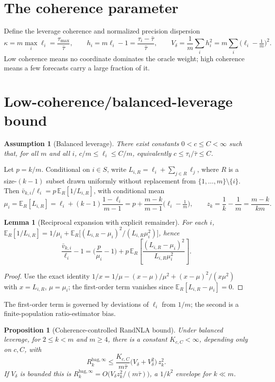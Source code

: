 \documentclass[11pt]{article}
\newcommand{\E}{\mathbb{E}}
\newcommand{\Rk}{R_k^{\mathrm{bag},\infty}}
\newtheorem{assumption}{Assumption}
\newtheorem{lemma}{Lemma}
\newtheorem{proposition}{Proposition}
\begin{document}
\section{The coherence parameter}
Define the leverage coherence and normalized precision dispersion
\[
  \kappa=m\max_i\ell_i=\frac{\tau_{\max}}{\bar\tau},\qquad
  h_i=m\ell_i-1=\frac{\tau_i-\bar\tau}{\bar\tau},\qquad
  V_\delta=\frac1m\sum_i h_i^2=m\sum_i\Big(\ell_i-\tfrac1m\Big)^2.
\]
Low coherence means no coordinate dominates the oracle weight; high coherence means a few
forecasts carry a large fraction of it.

\section{Low-coherence/balanced-leverage bound}
\begin{assumption}[Balanced leverage]\label{ass:bl}
There exist constants $0<c\le C<\infty$ such that, for all $m$ and all $i$,
$c/m\le\ell_i\le C/m$, equivalently $c\le\tau_i/\bar\tau\le C$.
\end{assumption}
Let $p=k/m$. Conditional on $i\in S$, write $L_{i,R}=\ell_i+\sum_{j\in R}\ell_j$, where $R$
is a size-$(k-1)$ subset drawn uniformly without replacement from $\{1,\dots,m\}\setminus\{i\}$.
Then $\bar v_{k,i}/\ell_i=p\,\E_R[1/L_{i,R}]$, with conditional mean
\[
  \mu_i=\E_R[L_{i,R}]=\ell_i+(k-1)\frac{1-\ell_i}{m-1}
  =p+\frac{m-k}{m-1}\Big(\ell_i-\tfrac1m\Big),\qquad
  z_k=\frac1k-\frac1m=\frac{m-k}{km}.
\]
\begin{lemma}[Reciprocal expansion with explicit remainder]\label{lem:recip}
For each $i$,
$\E_R[1/L_{i,R}]=1/\mu_i+\E_R\!\big[(L_{i,R}-\mu_i)^2/(L_{i,R}\mu_i^2)\big]$, hence
\[
  \frac{\bar v_{k,i}}{\ell_i}-1=\Big(\frac{p}{\mu_i}-1\Big)
  +p\,\E_R\!\left[\frac{(L_{i,R}-\mu_i)^2}{L_{i,R}\mu_i^2}\right].
\]
\end{lemma}
\begin{proof}
Use the exact identity $1/x=1/\mu-(x-\mu)/\mu^2+(x-\mu)^2/(x\mu^2)$ with $x=L_{i,R}$,
$\mu=\mu_i$; the first-order term vanishes since $\E_R[L_{i,R}-\mu_i]=0$.
\end{proof}
The first-order term is governed by deviations of $\ell_i$ from $1/m$; the second is a
finite-population ratio-estimator bias.
\begin{proposition}[Coherence-controlled RandNLA bound]\label{prop:lowcoh}
Under balanced leverage, for $2\le k<m$ and $m\ge4$, there is a constant $K_{c,C}<\infty$,
depending only on $c,C$, with
\begin{equation}\label{eq:lowcoh}
  \Rk\le\frac{K_{c,C}}{m\bar\tau}\big(V_\delta+V_\delta^2\big)\,z_k^2 .
\end{equation}
If $V_\delta$ is bounded this is $\Rk=O\!\big(V_\delta z_k^2/(m\bar\tau)\big)$, a $1/k^2$
envelope for $k\ll m$.
\end{proposition}
\end{document}
